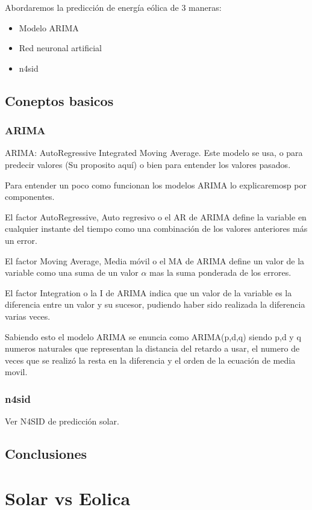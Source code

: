 Abordaremos la predicción de energía eólica de 3 maneras:
\begin{itemize}
	\item Modelo ARIMA
	\item Red neuronal artificial
	\item n4sid
\end{itemize}

\subsection{Coneptos basicos} 
\label{sub:coneptos_basicos}

\subsubsection{ARIMA}
\label{ssub:arima}

ARIMA: AutoRegressive Integrated Moving Average. Este modelo se usa, o para predecir valores (Su proposito aquí) o bien para entender los valores pasados.

Para entender un poco como funcionan los modelos ARIMA lo explicaremosp por componentes.

El factor AutoRegressive, Auto regresivo o el AR de ARIMA define la variable en cualquier instante del tiempo como una combinación de los valores anteriores más un error.

El factor Moving Average, Media móvil o el MA de ARIMA define un valor de la variable como una suma de un valor $\alpha$ mas la suma ponderada de los errores.

El factor Integration o la I de ARIMA indica que un valor de la variable es la diferencia entre un valor y su sucesor, pudiendo haber sido realizada la diferencia varias veces.

Sabiendo esto el modelo ARIMA se enuncia como ARIMA(p,d,q) siendo p,d y q numeros naturales que representan la distancia del retardo a usar, el numero de veces que se realizó la resta en la diferencia y el orden de la ecuación de media movil.


\subsubsection{n4sid}
\label{ssub:n4sid}

Ver N4SID de predicción solar.



\subsection{Conclusiones} 
\label{sub:conclusiones}



\section{Solar vs Eolica} 
\label{sec:solar_vs_eolica}




